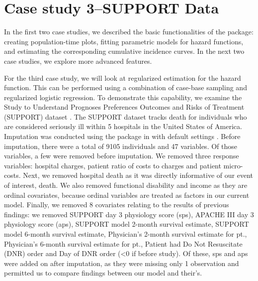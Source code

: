 \documentclass[
]{jss}
\begin{document}
\hypertarget{case-study-3support-data}{%
\section{Case study 3--SUPPORT Data}\label{case-study-3support-data}}

In the first two case studies, we described the basic functionalities of
the  package: creating population-time plots, fitting
parametric models for hazard functions, and estimating the corresponding
cumulative incidence curves. In the next two case studies, we explore
more advanced features.

For the third case study, we will look at regularized estimation for the
hazard function. This can be performed using a combination of case-base
sampling and regularized logistic regression. To demonstrate this
capability, we examine the Study to Understand Prognoses Preferences
Outcomes and Risks of Treatment (SUPPORT) dataset
\citep{knaus1995support}. The SUPPORT dataset tracks death for
individuals who are considered seriously ill within 5 hospitals in the
United States of America. Imputation was conducted using the 
package in  with default settings \citep{mice}. Before
imputation, there were a total of 9105 individuals and 47 variables. Of
those variables, a few were removed before imputation. We removed three
response variables: hospital charges, patient ratio of costs to charges
and patient micro-costs. Next, we removed hospital death as it was
directly informative of our event of interest, death. We also removed
functional disability and income as they are ordinal covariates, because
ordinal variables are treated as factors in our current model. Finally,
we removed 8 covariates relating to the results of previous findings: we
removed SUPPORT day 3 physiology score (sps), APACHE III day 3
physiology score (aps), SUPPORT model 2-month survival estimate, SUPPORT
model 6-month survival estimate, Physician's 2-month survival estimate
for pt., Physician's 6-month survival estimate for pt., Patient had Do
Not Resuscitate (DNR) order and Day of DNR order (\textless{}0 if before
study). Of these, sps and aps were added on after imputation, as they
were missing only 1 observation and permitted us to compare findings
between our model and their's.
\end{document}
